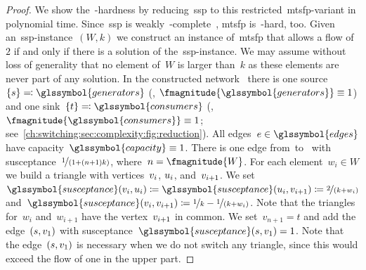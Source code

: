 \begin{proof}
  We show the~\NP-hardness by reducing~\gls{ssp} to this
  restricted~\gls{mtsfp}-variant in polynomial time. Since~\gls{ssp} is
  weakly~\NP-complete~\parencite{Gar79}, \gls{mtsfp} is~\NP-hard, too.
 Given an~\gls{ssp}-instance~$(W, k)$ we construct an instance
 of~\gls{mtsfp} that allows a flow of~$2$ if and only if there is a solution
 of the~\gls{ssp}-instance. We may assume without loss of generality that
 no element of~$W$ is larger than~$k$ as these elements are never part of any
 solution. In the constructed network~ there is one
 source~$\{\source\}\eqqcolon\glssymbol{generators}$ (\ie, $
 \fmagnitude{\glssymbol{generators}}\equiv 1$) and one sink~$
 \{\sink\}\eqcolon\glssymbol{consumers}$ (\ie, $
 \fmagnitude{\glssymbol{consumers}}\equiv 1$;
 see~\cref{ch:switching:sec:complexity:fig:reduction}). All
 edges~$\edge\in\glssymbol{edges}$ have
 capacity~$\glssymbol{capacity} \equiv 1$. There is one edge from~\source to~\sink
 with susceptance~$\nicefrac{1}{(1+(n+1)k)}$, where~$n=\fmagnitude{W}$. For each
 element~$w_i\in W$ we build a triangle with vertices~$v_i$, $u_i$,
 and~$v_ {i+1}$. We
 set~$\glssymbol{susceptance}(\vertex_i,\vertexa_i)\coloneqq
 \glssymbol{susceptance}
 (\vertexa_i,\vertex_{i+1})\coloneqq\nicefrac{2}{(k+w_i)}$
 and~$\glssymbol{susceptance}(\vertex_i,\vertex_{i+1})\coloneq\nicefrac{1}{k} -
 \nicefrac{1}{(k+w_i)}$. Note that the triangles for~$w_i$ and~$w_{i+1}$ have
 the vertex~$v_{i+1}$ in common. We set~$v_{n+1}=t$ and add the
 edge~$(s,v_1)$ with
 susceptance~$\glssymbol{susceptance}(\source,\vertex_1) = 1$. Note that the
 edge~$(s,v_1)$ is necessary when we do not switch any triangle,
 since this would exceed the flow of one in the upper part.
 

\end{proof}
